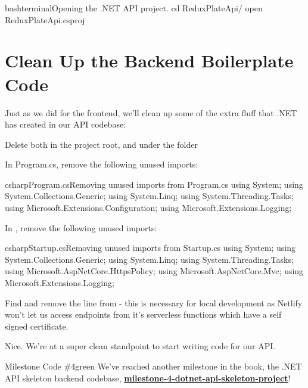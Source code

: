 \documentclass[a4paper,headinclude=on,footinclude=on,12pt,oneside]{scrbook}
\newcommand{\link}[2]{\textbf{\textcolor{monokaiPink}{\href{#2}{#1}}}}
\begin{document}
\begin{codeInput}{bash}{terminal}{Opening the .NET API project.}
cd ReduxPlateApi/
open ReduxPlateApi.csproj
\end{codeInput}

\section{Clean Up the Backend Boilerplate Code}

Just as we did for the frontend, we'll clean up some of the extra fluff that .NET has created in our API codebase:

\begin{arrows}
\item Delete both  in the project root, and  under the  folder
\item In Program.cs, remove the following unused imports:
\begin{codeInput}{csharp}{Program.cs}{Removing unused imports from Program.cs}
using System;
using System.Collections.Generic;
using System.Linq;
using System.Threading.Tasks;
using Microsoft.Extensions.Configuration;
using Microsoft.Extensions.Logging;
\end{codeInput}
\item In , remove the following unused imports:
\begin{codeInput}{csharp}{Startup.cs}{Removing unused imports from Startup.cs}
using System;
using System.Collections.Generic;
using System.Linq;
using System.Threading.Tasks;
using Microsoft.AspNetCore.HttpsPolicy;
using Microsoft.AspNetCore.Mvc;
using Microsoft.Extensions.Logging;
\item Find and remove the line  from  - this is necessary for local development as Netlify won't let us access endpoints from it's serverless functions which have a self signed certificate.
\end{codeInput}
\end{arrows}

Nice. We're at a super clean standpoint to start writing code for our API.

\begin{highlightBox}{Milestone Code \#4}{green}{\greenCheck}
We've reached another milestone in the book, the .NET API skeleton backend codebase, \link{milestone-4-dotnet-api-skeleton-project}{https://github.com/Full-Stack-SaaS-Product-Cookbook/milestone-4-dotnet-api-skeleton-project}!
\end{highlightBox}
\end{document}
